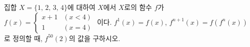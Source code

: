 집합 $X=\{1,\,2,\,3,\,4\}$에 대하여 $X$에서 $X$로의 함수 $f$가 $f(x)=\begin{cases} x+1 & (x<4) \\ 1 & (x=4) \end{cases}$ 이다. $f^1(x)=f(x)$, $f^{n+1}(x)=f(f^n(x))$로 정의할 때, $f^{50}(2)$의 값을 구하시오. 
